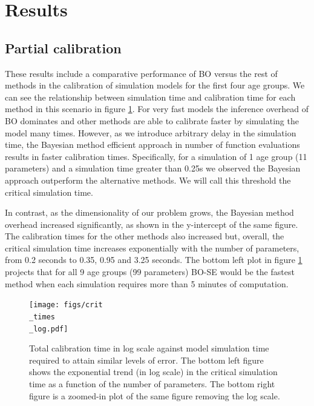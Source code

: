\documentclass{IOS-Book-Article}
\begin{document}
 
	\section{Results}
	
	\label{sec:results-partial}
	\subsection{Partial calibration}
These results include a comparative performance of BO versus the rest of methods in the calibration of simulation models for the first four age groups. We can see the relationship between simulation time and calibration time for each method in this scenario in figure \ref{fig:sim_times}. For very fast models the inference overhead of BO dominates and other methods are able to calibrate faster by simulating the model many times. However, as we introduce arbitrary delay in the simulation time, the Bayesian method efficient approach in number of function evaluations results in faster calibration times. Specifically, for a simulation of 1 age group (11 parameters) and a simulation time greater than 0.25s we observed the Bayesian approach outperform the alternative methods. We will call this threshold the critical simulation time.

In contrast, as the dimensionality of our problem grows, the Bayesian method overhead increased significantly, as shown in the y-intercept of the same figure. The calibration times for the other methods also increased but, overall, the critical simulation time increases exponentially with the number of parameters, from 0.2 seconds to 0.35, 0.95 and 3.25 seconds. The bottom left plot in figure \ref{fig:sim_times} projects that for all 9 age groups (99 parameters) BO-SE would be the fastest method when each simulation requires more than 5 minutes of computation.
	
	\begin{figure}[h!]
		\centering	
		\texttt{[image: figs/crit\\\_times\\\_log.pdf]}		
		\caption{Total calibration time in log scale against model simulation time required to attain similar levels of error. The bottom left figure shows the exponential trend (in log scale) in the critical simulation time as a function of the number of parameters. The bottom right figure is a zoomed-in plot of the same figure removing the log scale.}
		\label{fig:sim_times}	
	\end{figure}
	
\end{document}

